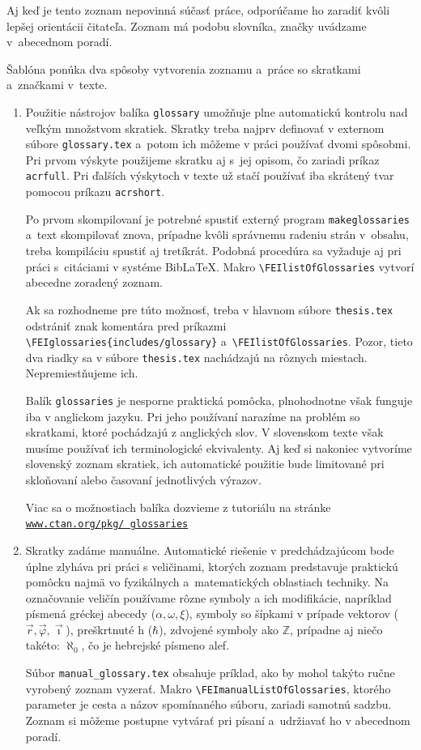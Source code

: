 Aj keď je tento zoznam nepovinná súčasť práce,
odporúčame ho zaradiť kvôli lepšej orientácii čitateľa.
Zoznam má podobu slovníka,
značky uvádzame v~abecednom poradí.

Šablóna ponúka dva spôsoby vytvorenia zoznamu a~práce so skratkami a~značkami v~texte.
\begin{enumerate}
\item Použitie nástrojov balíka \verb|glossary| umožňuje plne automatickú kontrolu nad veľkým množstvom skratiek. Skratky treba najprv definovať v externom súbore \verb|glossary.tex| a~potom ich môžeme v práci používať dvomi spôsobmi. Pri prvom výskyte použijeme skratku aj s~jej opisom, čo zariadi príkaz \verb|acrfull|.
Pri ďalších výskytoch v texte už stačí používať iba skrátený tvar pomocou príkazu \verb|acrshort|.

Po prvom skompilovaní je potrebné spustiť externý program \verb|makeglossaries| a~text skompilovať znova, prípadne kvôli správnemu radeniu strán v~obsahu, treba kompiláciu spustiť aj tretíkrát.
Podobná procedúra sa vyžaduje aj pri práci s~citáciami v systéme Bib\LaTeX.
Makro \verb|\FEIlistOfGlossaries| vytvorí abecedne zoradený zoznam.

Ak sa rozhodneme pre túto možnosť,
treba v hlavnom súbore \verb|thesis.tex| odstrániť
znak komentára pred príkazmi
\verb|\FEIglossaries{includes/glossary}|
a~\verb|\FEIlistOfGlossaries|. Pozor, tieto dva
riadky sa v súbore \verb|thesis.tex|
nachádzajú na rôznych miestach.
Nepremiestňujeme ich.

Balík \verb|glossaries| je nesporne praktická pomôcka, plnohodnotne však funguje iba v anglickom jazyku.
Pri jeho používaní narazíme na problém so skratkami, ktoré pochádzajú z anglických slov.
V slovenskom texte však musíme používať ich terminologické ekvivalenty.
Aj keď si nakoniec vytvoríme slovenský zoznam skratiek, ich automatické použitie bude limitované pri skloňovaní alebo časovaní jednotlivých výrazov.

Viac sa o možnostiach balíka dozvieme z tutoriálu na stránke \href{https://www.ctan.org/pkg/glossaries}{\texttt{www.ctan.org/pkg/ glossaries}}

\item Skratky zadáme manuálne.
Automatické riešenie v predchádzajúcom bode úplne zlyháva pri práci s veličinami, ktorých zoznam predstavuje praktickú pomôcku najmä vo fyzikálnych a~matematických oblastiach techniky. Na označovanie veličín používame rôzne symboly a ich modifikácie, napríklad písmená gréckej abecedy ($\alpha, \omega, \xi$), symboly so šípkami v prípade vektorov ($\vec r, \vec\varphi, \vec\imath$), preškrtnuté h ($\hbar$), zdvojené symboly ako $\mathbb Z$, prípadne aj niečo takéto: $\aleph_0$, čo je hebrejské písmeno alef.

Súbor \verb|manual_glossary.tex| obsahuje príklad, ako by mohol takýto ručne vyrobený zoznam vyzerať.
Makro
\verb|\FEImanualListOfGlossaries|, ktorého parameter je cesta a názov spomínaného súboru, zariadi samotnú sadzbu.
Zoznam si môžeme postupne vytvárať pri písaní a~udržiavať ho v abecednom poradí.
\end{enumerate}


